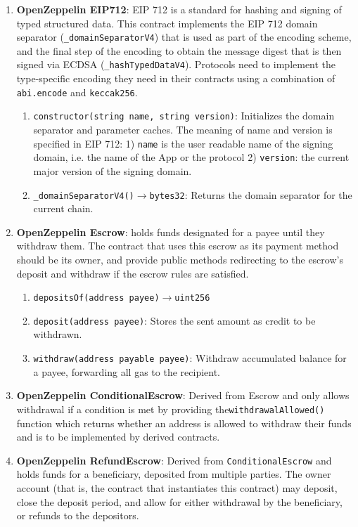 \begin{enumerate}
\item\textbf{OpenZeppelin EIP712}: EIP 712 is a standard for hashing and signing of typed structured data. This contract implements the EIP 712 domain separator (\verb|_domainSeparatorV4|) that is used as part of the encoding scheme, and the final step of the encoding to obtain the message digest that is then signed via ECDSA (\verb|_hashTypedDataV4|). Protocols need to implement the type-specific encoding they need in their contracts using a combination of \verb|abi.encode| and \verb|keccak256|.
	\begin{enumerate}
	\item\verb|constructor(string name, string version)|: Initializes the domain separator and parameter caches. The meaning of name and version is specified in EIP 712: 1) \verb|name| is the user readable name of the signing domain, i.e. the name of the \DJ App or the protocol 2) \verb|version|: the current major version of the signing domain.
	\item\verb|_domainSeparatorV4()|$\rightarrow$\verb|bytes32|: Returns the domain separator for the current chain.
	\end{enumerate}

\item\textbf{OpenZeppelin Escrow}: holds funds designated for a payee until they withdraw them. The contract that uses this escrow as its payment method should be its owner, and provide public methods redirecting to the escrow's deposit and withdraw if the escrow rules are satisfied.
	\begin{enumerate}
	\item\verb|depositsOf(address payee)|$\rightarrow$\verb|uint256|
	\item\verb|deposit(address payee)|: Stores the sent amount as credit to be withdrawn.
	\item\verb|withdraw(address payable payee)|: Withdraw accumulated balance for a payee, forwarding all gas to the recipient.
	\end{enumerate}

\item\textbf{OpenZeppelin ConditionalEscrow}: Derived from Escrow and only allows withdrawal if a condition is met by providing the\linebreak\verb|withdrawalAllowed()| function which returns whether an address is allowed to withdraw their funds and is to be implemented by derived contracts.

\item\textbf{OpenZeppelin RefundEscrow}: Derived from \verb|ConditionalEscrow| and holds funds for a beneficiary, deposited from multiple parties. The owner account (that is, the contract that instantiates this contract) may deposit, close the deposit period, and allow for either withdrawal by the beneficiary, or refunds to the depositors.


\end{enumerate}
